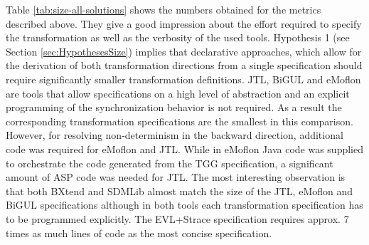 Table \ref{tab:size-all-solutions} shows the numbers obtained for the metrics described above. They give a good impression about the effort required to specify the transformation as well as the verbosity of the used tools. Hypothesis 1 (see Section \ref{sec:HypothesesSize}) implies that declarative approaches, which allow for the derivation of both transformation directions from a single specification should require significantly smaller transformation definitions. JTL, BiGUL and eMoflon are tools that allow specifications on a high level of abstraction and an explicit programming of the synchronization behavior is not required. As a result the corresponding transformation specifications are the smallest in this comparison. However, for resolving non-determinism in the backward direction, additional code was required for eMoflon and JTL. While in eMoflon Java code was supplied to orchestrate the code generated from the TGG specification, a significant amount of ASP code was needed for JTL. 
The most interesting observation is that both BXtend and SDMLib almost match the size of the JTL, eMoflon and BiGUL specifications although in both tools each transformation specification has to be programmed explicitly. The EVL+Strace specification requires approx. 7 times as much lines of code as the most concise specification. 